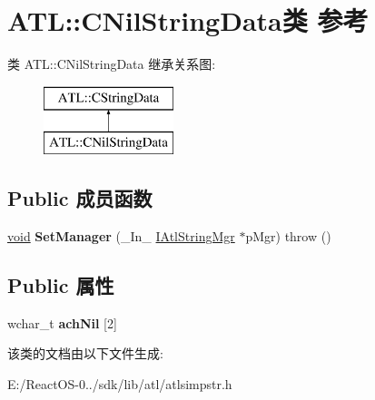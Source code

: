 \hypertarget{class_a_t_l_1_1_c_nil_string_data}{}\section{A\+TL\+:\+:C\+Nil\+String\+Data类 参考}
\label{class_a_t_l_1_1_c_nil_string_data}
类 A\+TL\+:\+:C\+Nil\+String\+Data 继承关系图\+:\begin{figure}[H]
\begin{center}
\leavevmode
\includegraphics[height=2.000000cm]{class_a_t_l_1_1_c_nil_string_data}
\end{center}
\end{figure}
\subsection*{Public 成员函数}
\begin{DoxyCompactItemize}
\item 
\mbox{\label{class_a_t_l_1_1_c_nil_string_data_ac38c6567a87668e15e846f3474228d30}} 
\hyperlink{interfacevoid}{void} {\bfseries Set\+Manager} (\+\_\+\+In\+\_\+ \hyperlink{class_a_t_l_1_1_i_atl_string_mgr}{I\+Atl\+String\+Mgr} $\ast$p\+Mgr)  throw ()
\end{DoxyCompactItemize}
\subsection*{Public 属性}
\begin{DoxyCompactItemize}
\item 
\mbox{\label{class_a_t_l_1_1_c_nil_string_data_ae1bfedbc5251ae543ad349119e1aef24}} 
wchar\+\_\+t {\bfseries ach\+Nil} \mbox{[}2\mbox{]}
\end{DoxyCompactItemize}


该类的文档由以下文件生成\+:\begin{DoxyCompactItemize}
\item 
E\+:/\+React\+O\+S-\/0../sdk/lib/atl/atlsimpstr.\+h\end{DoxyCompactItemize}
